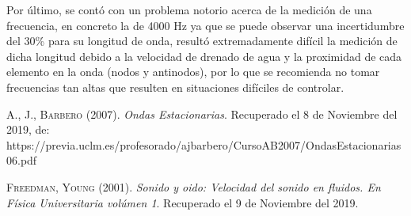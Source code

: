 \documentclass[10pt,a4paper]{article}
\begin{document}
Por último, se contó con un problema notorio acerca de la medición de una frecuencia, en concreto la de 4000 Hz ya que se puede observar una incertidumbre del 30\% para su longitud de onda, resultó extremadamente difícil la medición de dicha longitud debido a la velocidad de drenado de agua y la proximidad de cada elemento en la onda (nodos y antinodos), por lo que se recomienda no tomar frecuencias tan altas que resulten en situaciones difíciles de controlar.


\begin{thebibliography}{a}

 \textsc{A., J., Barbero} (2007). \textit{Ondas Estacionarias}. Recuperado el 8 de Noviembre del 2019, de:  https://previa.uclm.es/profesorado/ajbarbero/CursoAB2007/OndasEstacionarias06.pdf

 \textsc{Freedman, Young }(2001). 
\textit{Sonido y oido: Velocidad del sonido en fluidos. En Física Universitaria volúmen 1}. Recuperado el 9 de Noviembre del 2019.


\end{thebibliography}
\end{document}
